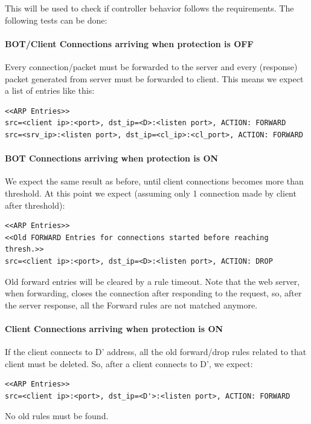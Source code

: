 This will be used to check if controller behavior follows the requirements. The following tests can be done:

\paragraph{BOT/Client Connections arriving when protection is OFF}
Every connection/packet must be forwarded to the server and every (response) packet generated from server must be forwarded to client. This means we expect a list of entries like this:
\begin{lstlisting}
<<ARP Entries>>
src=<client ip>:<port>, dst_ip=<D>:<listen port>, ACTION: FORWARD
src=<srv_ip>:<listen port>, dst_ip=<cl_ip>:<cl_port>, ACTION: FORWARD
\end{lstlisting}

\paragraph{BOT Connections arriving when protection is ON}
We expect the same result as before, until client connections becomes more than threshold. At this point we expect (assuming only 1 connection made by client after threshold):
\begin{lstlisting}
<<ARP Entries>>
<<Old FORWARD Entries for connections started before reaching thresh.>>
src=<client ip>:<port>, dst_ip=<D>:<listen port>, ACTION: DROP
\end{lstlisting}
Old forward entries will be cleared by a rule timeout. Note that the web server, when forwarding, closes the connection after responding to the request, so, after the server response, all the Forward rules are not matched anymore.

\paragraph{Client Connections arriving when protection is ON}
If the client connects to D' address, all the old forward/drop rules related to that client must be deleted. So, after a client connects to D', we expect:
\begin{lstlisting}
<<ARP Entries>>
src=<client ip>:<port>, dst_ip=<D'>:<listen port>, ACTION: FORWARD
\end{lstlisting}
No old rules must be found.


